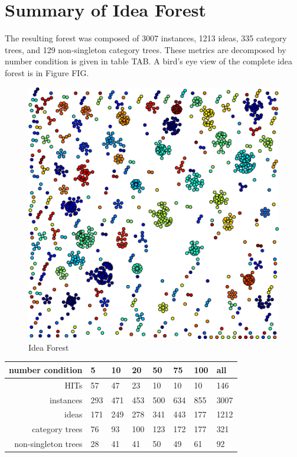 \section{Summary of Idea Forest}

The resulting forest was composed of 3007 instances, 1213 ideas, 335 category trees, and 129 non-singleton category trees. These metrics are decomposed by number condition is given in table TAB. A bird's eye view of the complete idea forest is in Figure FIG.

\begin{figure}[h!]
    \centering
    \includegraphics[width=0.9\columnwidth]{idea_forest}
    \caption{Idea Forest}
\end{figure}

\begin{table}
	\begin{tabular}[h!]{r | l l l l l l l}
	\textbf{number condition} & 5 & 10 & 20 & 50 & 75 & 100 & all \\ \hline \hline
	HITs & 57 & 47 & 23 & 10 & 10 & 10 & 146\\
	instances & 293 & 471 & 453 & 500 & 634 & 855 & 3007\\
	ideas & 171 & 249 & 278 & 341 & 443 & 177 &1212\\
	category trees & 76 & 93 & 100 & 123 & 172 & 177 &321\\
	non-singleton trees & 28 & 41 & 41 & 50 & 49 & 61 &92\\
	\end{tabular}
\end{table}

